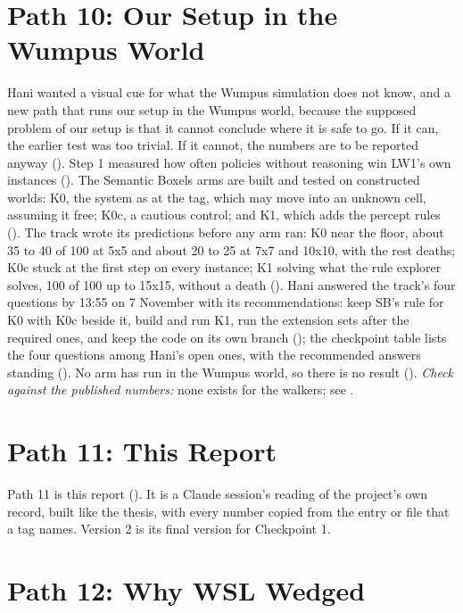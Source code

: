 \section{Path 10: Our Setup in the Wumpus World}
\label{sec:path10}

Hani wanted a visual cue for what the Wumpus simulation does not know, and a new path
that runs our setup in the Wumpus world, because the supposed problem of our setup is
that it cannot conclude where it is safe to go. If it can, the earlier test was too
trivial. If it cannot, the numbers are to be reported anyway (). Step 1
measured how often policies without reasoning win LW1's own instances
(). The Semantic Boxels arms are built and tested on constructed
worlds: K0, the system as at the tag, which may move into an unknown cell, assuming
it free; K0c, a cautious control; and K1, which adds the percept rules (). The
track wrote its predictions before any arm ran: K0 near the floor, about 35 to 40 of
100 at 5x5 and about 20 to 25 at 7x7 and 10x10, with the rest deaths; K0c stuck at
the first step on every instance; K1 solving what the rule explorer solves, 100 of 100
up to 15x15, without a death (). Hani answered the track's four questions by
13:55 on 7 November with its recommendations: keep SB's rule for K0 with K0c beside
it, build and run K1, run the extension sets after the required ones, and keep the code
on its own branch (); the checkpoint table lists the four questions among
Hani's open ones, with the recommended answers standing (). No
arm has run in the Wumpus world, so there is no result ().
\emph{Check against the published numbers:} none exists for the walkers; see
.

\section{Path 11: This Report}
\label{sec:path11}

Path 11 is this report (). It is a Claude session's reading of the project's own
record, built like the thesis, with every number copied from the entry or file that a
tag names. Version 2 is its final version for Checkpoint 1.

\section{Path 12: Why WSL Wedged}
\label{sec:path12}

